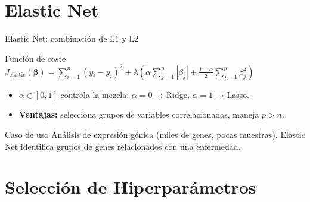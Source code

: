 \documentclass[aspectratio=169, 10pt, xcolor=table]{beamer}
\begin{document}
\section{Elastic Net}

\begin{frame}{Elastic Net: combinación de L1 y L2}
    \begin{block}{Función de coste}
        $\displaystyle J_{\text{elastic}}(\boldsymbol{\beta}) = \sum_{i=1}^n (y_i - \hat{y}_i)^2 + \lambda \left( \alpha \sum_{j=1}^p |\beta_j| + \frac{1-\alpha}{2} \sum_{j=1}^p \beta_j^2 \right)$
    \end{block}
    \begin{itemize}
        \item $\alpha \in [0,1]$ controla la mezcla: $\alpha=0$ → Ridge, $\alpha=1$ → Lasso.
        \item \textbf{Ventajas:} selecciona grupos de variables correlacionadas, maneja $p > n$.
    \end{itemize}
    \begin{exampleblock}{Caso de uso}
        Análisis de expresión génica (miles de genes, pocas muestras). Elastic Net identifica grupos de genes relacionados con una enfermedad.
    \end{exampleblock}
\end{frame}

\section{Selección de Hiperparámetros}
\end{document}
